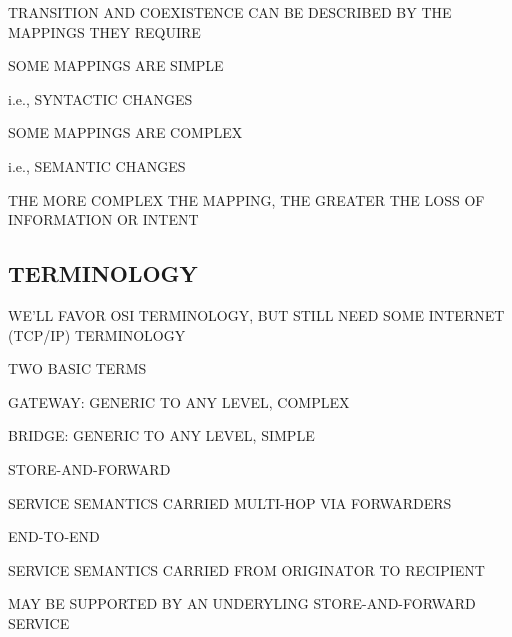 \begin{bwslide}

\begin{nrtc}
\item	TRANSITION AND COEXISTENCE CAN BE DESCRIBED BY THE MAPPINGS THEY
	REQUIRE

\item	SOME MAPPINGS ARE SIMPLE
    \begin{nrtc}
    \item	i.e., SYNTACTIC CHANGES
    \end{nrtc}

\item	SOME MAPPINGS ARE COMPLEX
    \begin{nrtc}
    \item	i.e., SEMANTIC CHANGES
    \end{nrtc}

\item	THE MORE COMPLEX THE MAPPING, THE GREATER THE LOSS OF INFORMATION OR
	INTENT
\end{nrtc}
\end{bwslide}


\begin{bwslide}
\part*	{TERMINOLOGY}\bf

\begin{nrtc}
\item	WE'LL FAVOR OSI TERMINOLOGY, BUT STILL NEED SOME INTERNET (TCP/IP)
	TERMINOLOGY

\item	TWO BASIC TERMS
    \begin{nrtc}
    \item	GATEWAY: GENERIC TO ANY LEVEL, COMPLEX

    \item	BRIDGE: GENERIC TO ANY LEVEL, SIMPLE
    \end{nrtc}
\end{nrtc}
\end{bwslide}


\begin{bwslide}

\begin{nrtc}
\item	STORE-AND-FORWARD
    \begin{nrtc}
    \item	SERVICE SEMANTICS CARRIED MULTI-HOP VIA FORWARDERS
    \end{nrtc}

\item	END-TO-END
    \begin{nrtc}
    \item	SERVICE SEMANTICS CARRIED FROM ORIGINATOR TO RECIPIENT

    \item	MAY BE SUPPORTED BY AN UNDERYLING STORE-AND-FORWARD SERVICE
    \end{nrtc}
\end{nrtc}
\end{bwslide}


